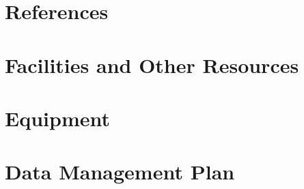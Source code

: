 \documentclass[11pt,article,crop=false]{standalone}
\begin{document}
\thispagestyle{empty}
\AddToShipoutPicture*{\BackgroundPic}



\clearpage
{}

\thispagestyle{fancy}
\setlength{\headheight}{19.7478pt}
\setlength{\headsep}{4pt}
\newlength{\nsfoffset}
\setlength{\nsfoffset}{\headheight}
\addtolength{\nsfoffset}{\baselineskip}



\clearpage

\appendix



\clearpage



\clearpage

%
\section{References}
\printbibliography[heading=bibempty]
\clearpage

\section{Facilities and Other Resources}\label{sec:facilities}


\section{Equipment}\label{sec:equipment}


\section{Data Management Plan}\label{sec:dataplan}

\end{document}
